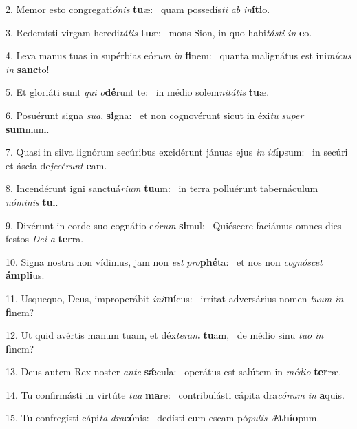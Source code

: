 2. Memor esto congregati\textit{ó}\textit{nis} \textbf{tu}æ: \ast\  quam possedís\textit{ti} \textit{ab} \textit{in}\textbf{í}\textbf{ti}o.\

3. Redemísti virgam heredi\textit{tá}\textit{tis} \textbf{tu}æ: \ast\  mons Sion, in quo habi\textit{tás}\textit{ti} \textit{in} \textbf{e}o.\

4. Leva manus tuas in supérbias eó\textit{rum} \textit{in} \textbf{fi}nem: \ast\  quanta malignátus est ini\textit{mí}\textit{cus} \textit{in} \textbf{sanc}to!\

5. Et gloriáti sunt \textit{qui} \textit{o}\textbf{dé}runt te: \ast\  in médio solem\textit{ni}\textit{tá}\textit{tis} \textbf{tu}æ.\

6. Posuérunt signa \textit{su}\textit{a}, \textbf{si}gna: \ast\  et non cognovérunt sicut in éxi\textit{tu} \textit{su}\textit{per} \textbf{sum}mum.\

7. Quasi in silva lignórum secúribus excidérunt jánuas ejus \textit{in} \textit{id}\textbf{íp}sum: \ast\  in secúri et áscia de\textit{je}\textit{cé}\textit{runt} \textbf{e}am.\

8. Incendérunt igni sanctuá\textit{ri}\textit{um} \textbf{tu}um: \ast\  in terra polluérunt tabernáculum \textit{nó}\textit{mi}\textit{nis} \textbf{tu}i.\

9. Dixérunt in corde suo cognátio e\textit{ó}\textit{rum} \textbf{si}mul: \ast\  Quiéscere faciámus omnes dies festos \textit{De}\textit{i} \textit{a} \textbf{ter}ra.\

10. Signa nostra non vídimus, jam non \textit{est} \textit{pro}\textbf{phé}ta: \ast\  et nos non \textit{co}\textit{gnó}\textit{scet} \textbf{ám}\textbf{pli}us.\

11. Usquequo, Deus, improperábit \textit{in}\textit{i}\textbf{mí}cus: \ast\  irrítat adversárius nomen \textit{tu}\textit{um} \textit{in} \textbf{fi}nem?\

12. Ut quid avértis manum tuam, et déx\textit{te}\textit{ram} \textbf{tu}am, \ast\  de médio sinu \textit{tu}\textit{o} \textit{in} \textbf{fi}nem?\

13. Deus autem Rex noster \textit{an}\textit{te} \textbf{sǽ}cula: \ast\  operátus est salútem in \textit{mé}\textit{di}\textit{o} \textbf{ter}ræ.\

14. Tu confirmásti in virtúte \textit{tu}\textit{a} \textbf{ma}re: \ast\  contribulásti cápita dra\textit{có}\textit{num} \textit{in} \textbf{a}quis.\

15. Tu confregísti cápi\textit{ta} \textit{dra}\textbf{có}nis: \ast\  dedísti eum escam pó\textit{pu}\textit{lis} \textit{Æ}\textbf{thí}\textbf{o}pum.\

